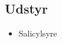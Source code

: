 \subsection*{Udstyr}
\begin{multicols}{2}
    \begin{itemize}
        \item Salicylsyre
    \end{itemize}    
\end{multicols}

